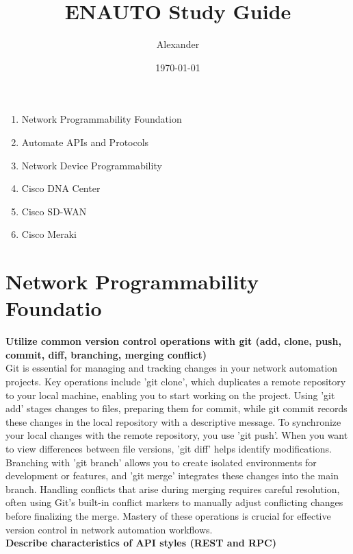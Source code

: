 \documentclass{article}
\title{ENAUTO Study Guide}
\author{Alexander}
\date{\today}
\begin{document}
\maketitle

\begin{enumerate}
\item Network Programmability Foundation
\item Automate APIs and Protocols
\item Network Device Programmability
\item Cisco DNA Center
\item Cisco SD-WAN
\item Cisco Meraki
\end{enumerate}

\section{Network Programmability Foundatio}
\textbf{Utilize common version control operations with git (add, clone, push, commit, diff, branching, merging conflict)}\\

	Git is essential for managing and tracking changes in your network automation projects. Key operations include 'git clone', which duplicates a remote repository to your local machine, enabling you to start working on the project. Using 'git add' stages changes to files, preparing them for commit, while git commit records these changes in the local repository with a descriptive message. To synchronize your local changes with the remote repository, you use 'git push'. When you want to view differences between file versions, 'git diff' helps identify modifications. Branching with 'git branch' allows you to create isolated environments for development or features, and 'git merge' integrates these changes into the main branch. Handling conflicts that arise during merging requires careful resolution, often using Git's built-in conflict markers to manually adjust conflicting changes before finalizing the merge. Mastery of these operations is crucial for effective version control in network automation workflows.\\

\textbf{Describe characteristics of API styles (REST and RPC)}\\
\end{document}
